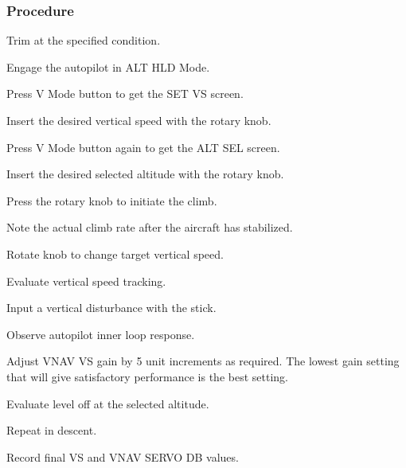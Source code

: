 \subsubsection*{Procedure}
 \begin{compactenum}
    \item Trim at the specified condition.
    \item Engage the autopilot in ALT HLD Mode.
    \item Press V Mode button to get the SET VS screen.
    \item Insert the desired vertical speed with the rotary knob.
    \item Press V Mode button again to get the ALT SEL screen.
    \item Insert the desired selected altitude with the rotary knob.
    \item Press the rotary knob to initiate the climb.  
    \item Note the actual climb rate after the aircraft has stabilized.
    \item Rotate knob to change target vertical speed.
    \item Evaluate vertical speed tracking.
    \item Input a vertical disturbance with the stick.
    \item Observe autopilot inner loop response.
    \item Adjust VNAV VS gain by 5 unit increments as required.  The lowest gain setting that will give satisfactory performance is the best setting.
    \item Evaluate level off at the selected altitude.
    \item Repeat in descent.
    \item Record final VS and VNAV SERVO DB values.
    \end{compactenum}
